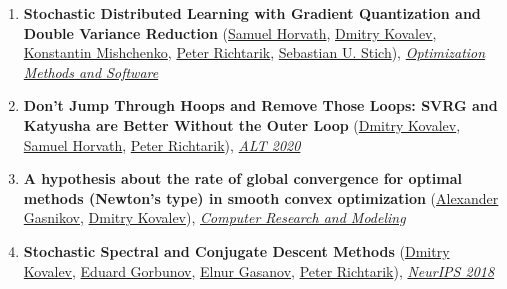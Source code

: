 \begin{enumerate}
\item \textbf{Stochastic Distributed Learning with Gradient Quantization and Double Variance Reduction} (\href{https://samuelhorvath.github.io}{\color{linkcolour}Samuel Horvath}, \href{https://www.dmitry-kovalev.com}{\color{linkcolour}Dmitry Kovalev}, \href{https://konstmish.github.io}{\color{linkcolour}Konstantin Mishchenko}, \href{https://richtarik.org}{\color{linkcolour}Peter Richtarik}, \href{https://sstich.ch}{\color{linkcolour}Sebastian U. Stich}), \href{https://www.tandfonline.com/doi/abs/10.1080/10556788.2022.2117355}{\em \color{black}Optimization Methods and Software}
\item \textbf{Don't Jump Through Hoops and Remove Those Loops: SVRG and Katyusha are Better Without the Outer Loop} (\href{https://www.dmitry-kovalev.com}{\color{linkcolour}Dmitry Kovalev}, \href{https://samuelhorvath.github.io}{\color{linkcolour}Samuel Horvath}, \href{https://richtarik.org}{\color{linkcolour}Peter Richtarik}), \href{http://proceedings.mlr.press/v117/kovalev20a}{\em \color{black}ALT 2020}
\item \textbf{A hypothesis about the rate of global convergence for optimal methods (Newton's type) in smooth convex optimization} (\href{https://scholar.google.ru/citations?user=AmeE8qkAAAAJ}{\color{linkcolour}Alexander Gasnikov}, \href{https://www.dmitry-kovalev.com}{\color{linkcolour}Dmitry Kovalev}), \href{http://crm-en.ics.org.ru/journal/article/2685/}{\em \color{black}Computer Research and Modeling}
\item \textbf{Stochastic Spectral and Conjugate Descent Methods} (\href{https://www.dmitry-kovalev.com}{\color{linkcolour}Dmitry Kovalev}, \href{https://eduardgorbunov.github.io}{\color{linkcolour}Eduard Gorbunov}, \href{https://elnurgasanov.com}{\color{linkcolour}Elnur Gasanov}, \href{https://richtarik.org}{\color{linkcolour}Peter Richtarik}), \href{https://papers.nips.cc/paper/7596-stochastic-spectral-and-conjugate-descent-methods}{\em \color{black}NeurIPS 2018}
\end{enumerate}
